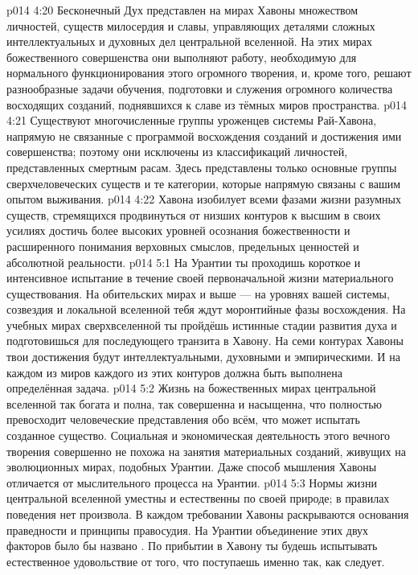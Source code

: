 \vs p014 4:20 Бесконечный Дух представлен на мирах Хавоны множеством личностей, существ милосердия и славы, управляющих деталями сложных интеллектуальных и духовных дел центральной вселенной. На этих мирах божественного совершенства они выполняют работу, необходимую для нормального функционирования этого огромного творения, и, кроме того, решают разнообразные задачи обучения, подготовки и служения огромного количества восходящих созданий, поднявшихся к славе из тёмных миров пространства.
\vs p014 4:21 Существуют многочисленные группы уроженцев системы Рай\hyp{}Хавона, напрямую не связанные с программой восхождения созданий и достижения ими совершенства; поэтому они исключены из классификаций личностей, представленных смертным расам. Здесь представлены только основные группы сверхчеловеческих существ и те категории, которые напрямую связаны с вашим опытом выживания.
\vs p014 4:22 Хавона изобилует всеми фазами жизни разумных существ, стремящихся продвинуться от низших контуров к высшим в своих усилиях достичь более высоких уровней осознания божественности и расширенного понимания верховных смыслов, предельных ценностей и абсолютной реальности.
\vs p014 5:1 На Урантии ты проходишь короткое и интенсивное испытание в течение своей первоначальной жизни материального существования. На обительских мирах и выше --- на уровнях вашей системы, созвездия и локальной вселенной тебя ждут моронтийные фазы восхождения. На учебных мирах сверхвселенной ты пройдёшь истинные стадии развития духа и подготовишься для последующего транзита в Хавону. На семи контурах Хавоны твои достижения будут интеллектуальными, духовными и эмпирическими. И на каждом из миров каждого из этих контуров должна быть выполнена определённая задача.
\vs p014 5:2 Жизнь на божественных мирах центральной вселенной так богата и полна, так совершенна и насыщенна, что полностью превосходит человеческие представления обо всём, что может испытать созданное существо. Социальная и экономическая деятельность этого вечного творения совершенно не похожа на занятия материальных созданий, живущих на эволюционных мирах, подобных Урантии. Даже способ мышления Хавоны отличается от мыслительного процесса на Урантии.
\vs p014 5:3 Нормы жизни центральной вселенной уместны и естественны по своей природе; в правилах поведения нет произвола. В каждом требовании Хавоны раскрываются основания праведности и принципы правосудия. На Урантии объединение этих двух факторов было бы названо . По прибытии в Хавону ты будешь испытывать естественное удовольствие от того, что поступаешь именно так, как следует.
